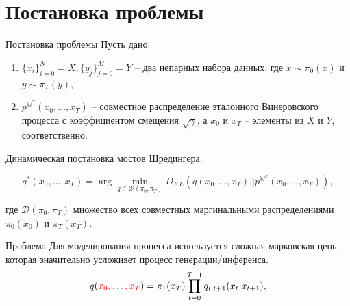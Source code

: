 \documentclass[10pt,pdf,hyperref={unicode}]{beamer}
\begin{document}
\section{Постановка проблемы}
\begin{frame}{Постановка проблемы}
Пусть дано:
\begin{enumerate}[1.]
    \item $\{x_i\}_{i=0}^N = X, \{y_j\}_{j=0}^M = Y$ -- два непарных набора данных,  где $x \sim \pi_0(x)$ и $y \sim \pi_T(y)$,
    \item $p^{\mathbb{W}^{\gamma}}(x_0, \dots, x_T)$ -- совместное распределение эталонного Винеровского процесса с коэффициентом смещения $\sqrt{\gamma}$, а $x_0$ и $x_T$ -- элементы из $X$ и $Y$, соответственно.
\end{enumerate}

Динамическая постановка мостов Шредингера:

\begin{equation}
    q^*(x_0, \dots, x_T) = \arg\min_{q\in \mathcal{D}(\pi_0, \pi_T)} D_{KL}(q(x_0, \dots, x_T)||p^{\mathbb{W}^{\gamma}}(x_0, \dots, x_T)),
    \label{eq:dyn}
\end{equation}

где $\mathcal{D}(\pi_0, \pi_T)$ множество всех совместных маргинальными распределениями $\pi_0(x_0)$ и $\pi_T(x_T)$.

\begin{alertblock}{Проблема}
    Для моделирования процесса используется сложная марковская цепь, которая значительно усложняет процесс генерации/инференса.
    \begin{equation*}
        q(\textcolor{red}{x_0, \dots, x_T}) = \pi_1(x_T) \prod_{t=0}^{T-1} q_{t|t+1} (x_t | x_{t+1}),
    \end{equation*}
\end{alertblock}
\end{frame}

\end{document}

